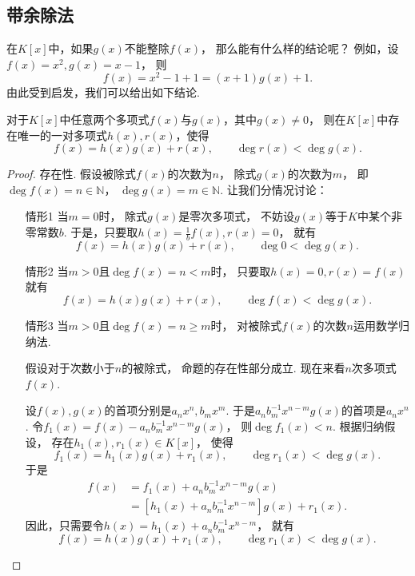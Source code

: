 \subsection{带余除法}
在\(K[x]\)中，如果\(g(x)\)不能整除\(f(x)\)，
那么能有什么样的结论呢？
例如，设\(f(x)=x^2,
g(x)=x-1\)，
则\begin{equation*}
	f(x)=x^2-1+1=(x+1)g(x)+1.
\end{equation*}
由此受到启发，我们可以给出如下结论.
\begin{theorem}\label{theorem:多项式.带余除法}
对于\(K[x]\)中任意两个多项式\(f(x)\)与\(g(x)\)，其中\(g(x)\neq0\)，
则在\(K[x]\)中存在唯一的一对多项式\(h(x),r(x)\)，使得\begin{equation*}
	f(x) = h(x) g(x) + r(x),
	\qquad
	\deg r(x) < \deg g(x).
\end{equation*}
\begin{proof}
存在性.
假设被除式\(f(x)\)的次数为\(n\)，
除式\(g(x)\)的次数为\(m\)，
即\(\deg f(x)=n\in\mathbb{N}\)，
\(\deg g(x)=m\in\mathbb{N}\).
让我们分情况讨论：\begin{enumerate}
	\item[情形1]
	当\(m=0\)时，
	除式\(g(x)\)是零次多项式，
	不妨设\(g(x)\)等于\(K\)中某个非零常数\(b\).
	于是，只要取\(h(x) = \frac1b f(x), r(x) = 0\)，
	就有\begin{equation*}
		f(x) = h(x) g(x) + r(x),
		\qquad
		\deg 0 < \deg g(x).
	\end{equation*}

	\item[情形2]
	当\(m>0\)且\(\deg f(x) = n < m\)时，
	只要取\(h(x) = 0, r(x) = f(x)\)
	就有\begin{equation*}
		f(x) = h(x) g(x) + r(x), \qquad
		\deg f(x) < \deg g(x).
	\end{equation*}

	\item[情形3]
	当\(m>0\)且\(\deg f(x) = n \geq m\)时，
	对被除式\(f(x)\)的次数\(n\)运用数学归纳法.

	假设对于次数小于\(n\)的被除式，
	命题的存在性部分成立.
	现在来看\(n\)次多项式\(f(x)\).

	设\(f(x),g(x)\)的首项分别是\(a_n x^n,b_m x^m\).
	于是\(a_n b_m^{-1} x^{n-m} g(x)\)的首项是\(a_n x^n\).
	令\(f_1(x) = f(x) - a_n b_m^{-1} x^{n-m} g(x)\)，
	则\(\deg f_1(x) < n\).
	根据归纳假设，
	存在\(h_1(x),r_1(x) \in K[x]\)，
	使得\begin{equation*}
		f_1(x) = h_1(x) g(x) + r_1(x), \qquad
		\deg r_1(x) < \deg g(x).
	\end{equation*}
	于是\begin{align*}
		f(x)
		&= f_1(x) + a_n b_m^{-1} x^{n-m} g(x) \\
		&= [h_1(x) + a_n b_m^{-1} x^{n-m}] g(x) + r_1(x).
	\end{align*}
	因此，只需要令\(h(x) = h_1(x) + a_n b_m^{-1} x^{n-m}\)，
	就有\begin{equation*}
		f(x) = h(x) g(x) + r_1(x),
		\qquad
		\deg r_1(x) < \deg g(x).
	\end{equation*}
\end{enumerate}


\end{proof}
\end{theorem}
